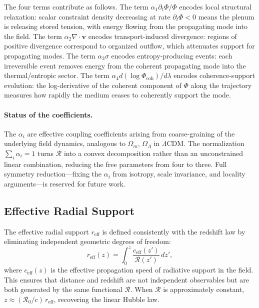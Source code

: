 \documentclass[12pt,a4paper]{article}
\theoremstyle{remark}
\newcommand{\vv}{\mathbf{v}}
\newcommand{\Rcal}{\mathcal{R}}
\newcommand{\reff}{r_{\mathrm{eff}}}
\newcommand{\ceff}{c_{\mathrm{eff}}}
\begin{document}
The four terms contribute as follows. The term $\alpha_1 \partial_t \Phi / \Phi$ encodes local structural relaxation: scalar constraint density decreasing at rate $\partial_t \Phi < 0$ means the plenum is releasing stored tension, with energy flowing from the propagating mode into the field. The term $\alpha_2 \nabla \cdot \vv$ encodes transport-induced divergence: regions of positive divergence correspond to organized outflow, which attenuates support for propagating modes. The term $\alpha_3 \sigma$ encodes entropy-producing events: each irreversible event removes energy from the coherent propagating mode into the thermal/entropic sector. The term $\alpha_4 d(\log \Phi_{\mathrm{coh}})/d\lambda$ encodes coherence-support evolution: the log-derivative of the coherent component of $\Phi$ along the trajectory measures how rapidly the medium ceases to coherently support the mode.

\paragraph{Status of the coefficients.} The $\alpha_i$ are effective coupling coefficients arising from coarse-graining of the underlying field dynamics, analogous to $\Omega_m$, $\Omega_\Lambda$ in $\Lambda$CDM. The normalization $\sum_i \alpha_i = 1$ turns $\Rcal$ into a convex decomposition rather than an unconstrained linear combination, reducing the free parameters from four to three. Full symmetry reduction---fixing the $\alpha_i$ from isotropy, scale invariance, and locality arguments---is reserved for future work.

\subsection{Effective Radial Support}

The effective radial support $\reff$ is defined consistently with the redshift law by eliminating independent geometric degrees of freedom:
\begin{equation}
\boxed{r_{\mathrm{eff}}(z) = \int_0^z \frac{\ceff(z')}{\Rcal(z')}\, dz',}
\label{eq:reff}
\end{equation}
where $\ceff(z)$ is the effective propagation speed of radiative support in the field. This ensures that distance and redshift are not independent observables but are both generated by the same functional $\Rcal$. When $\Rcal$ is approximately constant, $z \approx (\Rcal_0/c)\,\reff$, recovering the linear Hubble law.
\end{document}
